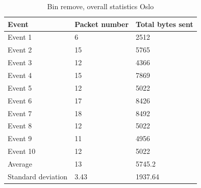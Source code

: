 \begin{table}[H]
\centering
\caption{Bin remove, overall statistics Oslo}
\label{tab:BRoverallOslo}
\begin{tabular}{|l|l|l|}
\hline
\textbf{Event} & \textbf{Packet number} & \textbf{Total bytes sent} \\ \hline
Event 1        & 6                      & 2512                      \\ \hline
Event 2        & 15                     & 5765                      \\ \hline
Event 3        & 12                     & 4366                      \\ \hline
Event 4        & 15                     & 7869                      \\ \hline
Event 5        & 12                     & 5022                      \\ \hline
Event 6        & 17                     & 8426                      \\ \hline
Event 7        & 18                     & 8492                      \\ \hline
Event 8        & 12                     & 5022                      \\ \hline
Event 9        & 11                     & 4956                      \\ \hline
Event 10       & 12                     & 5022                      \\ \hline
Average        & 13                     & 5745.2                    \\ \hline
Standard deviation        & 3.43
       & 1937.64               \\ \hline
\end{tabular}
\end{table}


